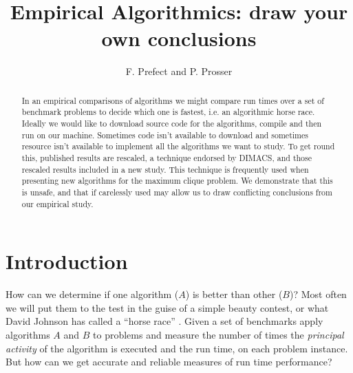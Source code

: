 \documentclass[runningheads]{llncs}
\begin{document}
\title{Empirical Algorithmics: draw your own conclusions}
\author{F. Prefect and P. Prosser}
\maketitle

\begin{abstract}
In an empirical comparisons of algorithms we might compare run times over a set of benchmark
problems to decide which one is fastest, i.e. an algorithmic horse race. Ideally we would like to
download source code for the algorithms, compile and then run on our machine. Sometimes code isn't
available to download and sometimes resource isn't available to implement all the algorithms we want
to study. To get round this, published results are rescaled, a technique endorsed by DIMACS, and those rescaled results included in a new study. 
This technique is frequently used when presenting new algorithms for the maximum clique problem.
We demonstrate that this
 is unsafe, and that if carelessly used may allow us
to draw conflicting conclusions from our empirical study.
\end{abstract}

\section{Introduction}
How can we determine if one algorithm ($A$) is better than other ($B$)? 
Most often we will put them to the test in the guise of a simple beauty contest, or what
David Johnson has called a ``horse race'' \cite{howTo}. Given a set of benchmarks apply algorithms $A$ and $B$ to problems and measure the 
number of times the \emph{principal activity} of the algorithm is executed and the run time, on each problem instance. 
But how can we get accurate and reliable measures of run time performance?
\end{document}
